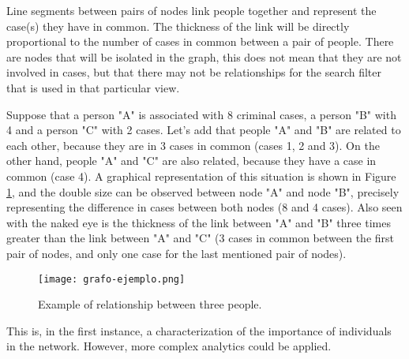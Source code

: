 Line segments between pairs of nodes link people together and represent the case(s) they have in common. The thickness of the link will be directly proportional to the number of cases in common between a pair of people. There are nodes that will be isolated in the graph, this does not mean that they are not involved in cases, but that there may not be relationships for the search filter that is used in that particular view.

Suppose that a person "A" is associated with 8 criminal cases, a person "B" with 4 and a person "C" with 2 cases. Let's add that people "A" and "B" are related to each other, because they are in 3 cases in common (cases 1, 2 and 3). On the other hand, people "A" and "C" are also related, because they have a case in common (case 4). A graphical representation of this situation is shown in Figure \ref{fig:grafode2}, and the double size can be observed between node "A" and node "B", precisely representing the difference in cases between both nodes (8 and 4 cases). Also seen with the naked eye is the thickness of the link between "A" and "B" three times greater than the link between "A" and "C" (3 cases in common between the first pair of nodes, and only one case for the last mentioned pair of nodes).
\begin{figure}
	\centering
	\texttt{[image: grafo-ejemplo.png]}
	\caption{Example of relationship between three people.}
	\label{fig:grafode2}
\end{figure}

This is, in the first instance, a characterization of the importance of individuals in the network.
However, more complex analytics could be applied.
